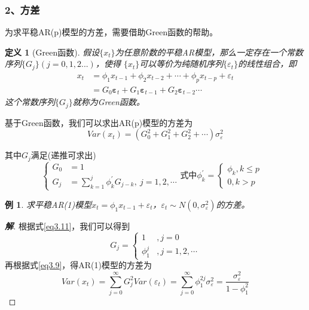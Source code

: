 \documentclass[12pt, a4paper, oneside]{ctexbook}
\newtheorem{definition}[theorem]{定义}
\newtheorem{example}[theorem]{例}
\newcommand\jie[2]{\begin{proof}[\textbf{#1}]
    #2
\end{proof}}
\begin{document}
\subsubsection{2、方差}
为求平稳AR(p)模型的方差，需要借助Green函数的帮助。
\begin{definition}[Green函数]
    假设$\{x_t\}$为任意阶数的平稳AR模型，那么一定存在一个常数序列$\{G_j\}(j=0,1,2...)$，使得
    $\{x_t\}$可以等价为纯随机序列$\{\varepsilon_t\}$的线性组合，即
    \begin{equation}\label{eq3.9}
        \begin{aligned}
            {x}_{t}
             & =\phi_1x_{t-1}+\phi_2x_{t-2}+\cdots+\phi_px_{t-p}+\varepsilon_t                                          \\
             & =G_0\boldsymbol{\varepsilon}_t+G_1\boldsymbol{\varepsilon}_{t-1}+G_2\boldsymbol{\varepsilon}_{t-2}\cdots
        \end{aligned}
    \end{equation}
    这个常数序列$\{G_j\}$就称为Green函数。
\end{definition}

基于Green函数，我们可以求出AR(p)模型的方差为
\begin{equation}
    Var(x_t)=\left(G_0^2+G_1^2+G_2^2+\cdots\right)\sigma_\varepsilon^2
\end{equation}

其中$G_j$满足(递推可求出)
\begin{equation}\label{eq3.11}
    \left.\left\{\begin{aligned}
        G_0 & =1                                                \\
        G_j & =\sum_{k=1}^j\phi_k^{\prime}G_{j-k},~j=1,2,\cdots
    \end{aligned}
    \right.\right.\text{式中}\phi_k^{\prime}=
    \begin{cases}\phi_k,k\leq p \\
        0,k>p &\end{cases}
\end{equation}

\begin{example}\label{ex3.2.3}
    求平稳AR(1)模型$x_t=\phi_1x_{t-1}+\varepsilon_t$，$\varepsilon_t\sim
        N(0,\sigma_{\varepsilon}^2)$的方差。
\end{example}
\jie{解}{
    根据式\ref{eq3.11}，我们可以得到
    \begin{equation*}
        G_j=\begin{cases}
            1        & ,j=0          \\
            \phi_1^j & ,j=1,2,\cdots
        \end{cases}
    \end{equation*}
    再根据式\ref{eq3.9}，得AR(1)模型的方差为
    \begin{equation*}
        Var(x_{t})=\sum_{j=0}^{\infty}G_{j}^{2}Var(\varepsilon_{t})
        =\sum_{j=0}^{\infty}\phi_{1}^{2j}\sigma_{\varepsilon}^{2}
        =\frac{\sigma_{\varepsilon}^{2}}{1-\phi_{1}^{2}}
    \end{equation*}
}
\end{document}
